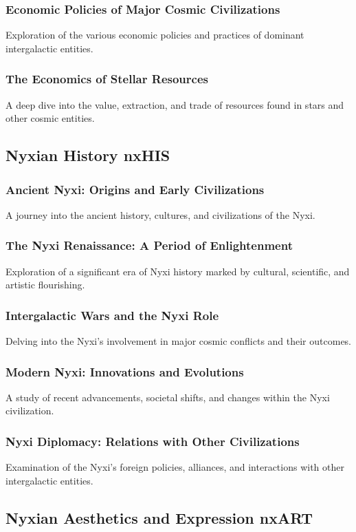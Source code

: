\subsubsection{Economic Policies of Major Cosmic Civilizations}
Exploration of the various economic policies and practices of dominant intergalactic entities.
\subsubsection{The Economics of Stellar Resources}
A deep dive into the value, extraction, and trade of resources found in stars and other cosmic entities.


\subsection{Nyxian History \hfill nxHIS}
\subsubsection{Ancient Nyxi: Origins and Early Civilizations}
A journey into the ancient history, cultures, and civilizations of the Nyxi.
\subsubsection{The Nyxi Renaissance: A Period of Enlightenment}
Exploration of a significant era of Nyxi history marked by cultural, scientific, and artistic flourishing.
\subsubsection{Intergalactic Wars and the Nyxi Role}
Delving into the Nyxi's involvement in major cosmic conflicts and their outcomes.
\subsubsection{Modern Nyxi: Innovations and Evolutions}
A study of recent advancements, societal shifts, and changes within the Nyxi civilization.
\subsubsection{Nyxi Diplomacy: Relations with Other Civilizations}
Examination of the Nyxi's foreign policies, alliances, and interactions with other intergalactic entities.


\subsection{Nyxian Aesthetics and Expression \hfill nxART}

